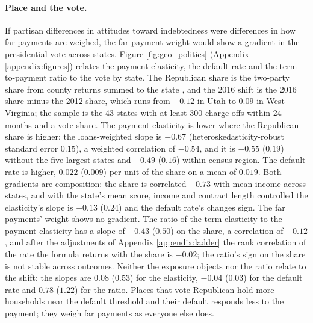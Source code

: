 \paragraph{Place and the vote.} If partisan differences in attitudes toward indebtedness were differences in how far payments are weighed, the far-payment weight would show a gradient in the presidential vote across states. Figure \ref{fig:geo_politics} (Appendix \ref{appendix:figures}) relates the payment elasticity, the default rate and the term-to-payment ratio to the vote by state. The Republican share is the two-party share from county returns summed to the state \citep{mcgovern_county_returns}, and the 2016 shift is the 2016 share minus the 2012 share, which runs from $-0.12$ in Utah to $0.09$ in West Virginia; the sample is the 43 states with at least 300 charge-offs within 24 months and a vote share. The payment elasticity is lower where the Republican share is higher: the loans-weighted slope is $-0.67$ (heteroskedasticity-robust standard error $0.15$), a weighted correlation of $-0.54$, and it is $-0.55$ ($0.19$) without the five largest states and $-0.49$ ($0.16$) within census region. The default rate is higher, $0.022$ ($0.009$) per unit of the share on a mean of $0.019$. Both gradients are composition: the share is correlated $-0.73$ with mean income across states, and with the state's mean score, income and contract length controlled the elasticity's slope is $-0.13$ ($0.24$) and the default rate's changes sign. The far payments' weight shows no gradient. The ratio of the term elasticity to the payment elasticity has a slope of $-0.43$ ($0.50$) on the share, a correlation of $-0.12$, and after the adjustments of Appendix \ref{appendix:ladder} the rank correlation of the rate the formula returns with the share is $-0.02$; the ratio's sign on the share is not stable across outcomes. Neither the exposure objects nor the ratio relate to the shift: the slopes are $0.08$ ($0.53$) for the elasticity, $-0.04$ ($0.03$) for the default rate and $0.78$ ($1.22$) for the ratio. Places that vote Republican hold more households near the default threshold and their default responds less to the payment; they weigh far payments as everyone else does.

\begin{table}[ht]
\centering
\caption{Person and place in auto-loan default: variance decomposition and movers}
\label{tab:person_place}
\resizebox{\textwidth}{!}{}
\end{table}
